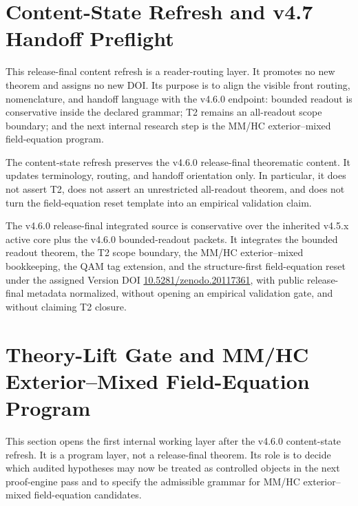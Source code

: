 \section{Content-State Refresh and v4.7 Handoff Preflight}
\label{sec:v460-content-state-refresh-v47-handoff}
This release-final content refresh is a reader-routing layer.  It promotes no
new theorem and assigns no new DOI.  Its purpose is to align the visible front
routing, nomenclature, and handoff language with the v4.6.0 endpoint: bounded
readout is conservative inside the declared grammar; T2 remains an all-readout
scope boundary; and the next internal research step is the MM/HC exterior--mixed
field-equation program.

\begin{proposition}
The content-state refresh preserves the v4.6.0 release-final theorematic content.
It updates terminology, routing, and handoff orientation only.  In particular,
it does not assert T2, does not assert an unrestricted all-readout theorem, and
does not turn the field-equation reset template into an empirical validation
claim.
\end{proposition}


\begin{theorem}
The v4.6.0 release-final integrated source is conservative over the inherited
v4.5.x active core plus the v4.6.0 bounded-readout packets.  It integrates the
bounded readout theorem, the T2 scope boundary, the MM/HC exterior--mixed
bookkeeping, the QAM tag extension, and the structure-first field-equation reset
under the assigned Version DOI \href{https://doi.org/10.5281/zenodo.20117361}{10.5281/zenodo.20117361}, with public release-final metadata normalized, without opening
an empirical validation gate, and without claiming T2 closure.
\end{theorem}


\section{Theory-Lift Gate and MM/HC Exterior--Mixed Field-Equation Program}
\label{sec:v470-r01-theory-lift-gate-extmix-program}
This section opens the first internal working layer after the v4.6.0
content-state refresh.  It is a program layer, not a release-final theorem.  Its
role is to decide which audited hypotheses may now be treated as controlled
objects in the next proof-engine pass and to specify the admissible grammar for
MM/HC exterior--mixed field-equation candidates.

